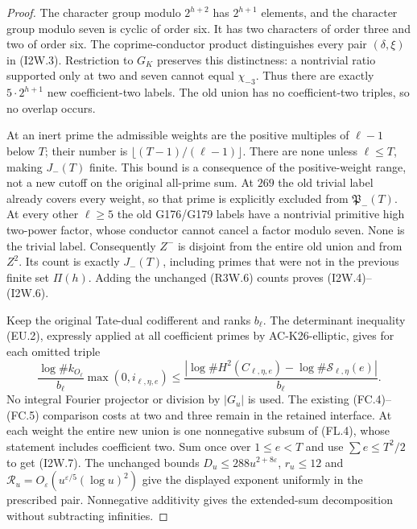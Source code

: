 \begin{proof}
The character group modulo $2^{h+2}$ has $2^{h+1}$ elements,
and the character group modulo seven is cyclic of order six.
It has two characters of order three and two of order six.
The coprime-conductor product distinguishes every pair
$(\delta,\xi)$ in (I2W.3).
Restriction to $G_K$ preserves this distinctness: a nontrivial
ratio supported only at two and seven cannot equal $\chi_{-3}$.
Thus there are exactly $5\cdot2^{h+1}$ new coefficient-two labels.
The old union has no coefficient-two triples, so no overlap occurs.

At an inert prime the admissible weights are the positive
multiples of $\ell-1$ below $T$; their number is
$\lfloor(T-1)/(\ell-1)\rfloor$.
There are none unless $\ell\leq T$, making $J_-(T)$ finite.
This bound is a consequence of the positive-weight range, not
a new cutoff on the original all-prime sum.
At $269$ the old trivial label already covers every weight,
so that prime is explicitly excluded from $\mathfrak P_-(T)$.
At every other $\ell\geq5$ the old G176/G179 labels have a
nontrivial primitive high two-power factor, whose conductor
cannot cancel a factor modulo seven.  None is the trivial label.
Consequently $Z^-$ is disjoint from the entire old union and
from $Z^2$.  Its count is exactly $J_-(T)$, including primes
that were not in the previous finite set $\Pi(h)$.
Adding the unchanged (R3W.6) counts proves (I2W.4)--(I2W.6).

Keep the original Tate-dual codifferent and ranks $b_\ell$.
The determinant inequality (EU.2), expressly applied at all
coefficient primes by AC-K26-elliptic, gives for each omitted triple
\[
 \frac{\log\#k_{O_\ell}}{b_\ell}\max(0,i_{\ell,\eta,e})
 \leq\frac{|\log\#H^2(C_{\ell,\eta,e})
                       -\log\#\mathcal S_{\ell,\eta}(e)|}{b_\ell}.
 \tag{I2W.9}
\]
No integral Fourier projector or division by $|G_u|$ is used.
The existing (FC.4)--(FC.5) comparison costs at two and three
remain in the retained interface.
At each weight the entire new union is one nonnegative subsum
of (FL.4), whose statement includes coefficient two.
Sum once over $1\leq e<T$ and use $\sum e\leq T^2/2$ to get
(I2W.7).  The unchanged bounds
$D_u\leq288u^{2+8\varepsilon}$, $r_u\leq12$ and
$\mathcal R_u=O_\varepsilon(u^{\varepsilon/5}(\log u)^2)$
give the displayed exponent uniformly in the prescribed pair.
Nonnegative additivity gives the extended-sum decomposition
without subtracting infinities.


\end{proof}

